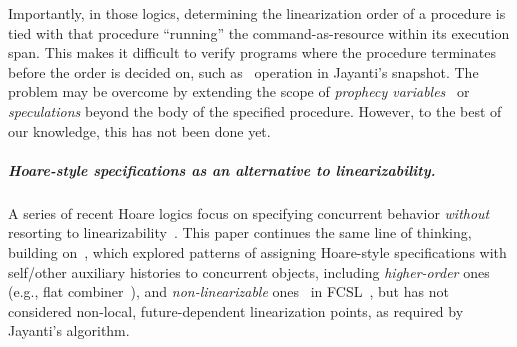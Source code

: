 Importantly, in those logics, determining the linearization order of a
procedure is tied with that procedure ``running'' the
command-as-resource within its execution span. This makes it difficult
to verify programs where the procedure terminates before the order is
decided on, such as \jywrite~operation in Jayanti's snapshot. The
problem may be overcome by extending the scope of \emph{prophecy
  variables}~\cite{AbadiL+lics88} or \emph{speculations} beyond the
body of the specified procedure. However, to the best of our
knowledge, this has not been done yet.


%

\subparagraph*{Hoare-style specifications as an alternative to
  linearizability.} 

A series of recent Hoare logics focus on specifying concurrent
behavior \emph{without} resorting to
linearizability~\cite{SergeyNB+ESOP15, SergeyNBD+OOPSLA16, SvendsenB+ESOP14,
  PintoDYG+ECOOP14, JungSSSTBD+POPL15}.
%
This paper continues the same line of thinking, building
on~\cite{SergeyNB+ESOP15}, which explored patterns of assigning
Hoare-style specifications with self/other auxiliary histories to
concurrent objects, including \emph{higher-order} ones (e.g., {flat
  combiner}~\cite{HendlerHIST+SPAA10}), and \emph{non-linearizable}
ones~\cite{SergeyNBD+OOPSLA16} in FCSL~\cite{NanevskiLSD+ESOP14}, but
has not considered non-local, future-dependent linearization points,
as required by Jayanti's algorithm.
%

